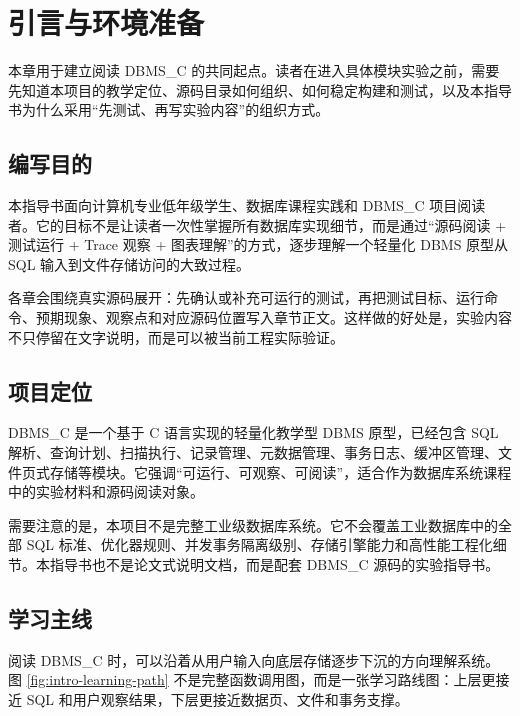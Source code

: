 \chapter{引言与环境准备}
\label{chap:intro}

本章用于建立阅读 DBMS\_C 的共同起点。读者在进入具体模块实验之前，需要先知道本项目的教学定位、源码目录如何组织、如何稳定构建和测试，以及本指导书为什么采用“先测试、再写实验内容”的组织方式。

\section{编写目的}
\label{sec:intro-purpose}

本指导书面向计算机专业低年级学生、数据库课程实践和 DBMS\_C 项目阅读者。它的目标不是让读者一次性掌握所有数据库实现细节，而是通过“源码阅读 + 测试运行 + Trace 观察 + 图表理解”的方式，逐步理解一个轻量化 DBMS 原型从 SQL 输入到文件存储访问的大致过程。

各章会围绕真实源码展开：先确认或补充可运行的测试，再把测试目标、运行命令、预期现象、观察点和对应源码位置写入章节正文。这样做的好处是，实验内容不只停留在文字说明，而是可以被当前工程实际验证。

\section{项目定位}
\label{sec:intro-positioning}

DBMS\_C 是一个基于 C 语言实现的轻量化教学型 DBMS 原型，已经包含 SQL 解析、查询计划、扫描执行、记录管理、元数据管理、事务日志、缓冲区管理、文件页式存储等模块。它强调“可运行、可观察、可阅读”，适合作为数据库系统课程中的实验材料和源码阅读对象。

需要注意的是，本项目不是完整工业级数据库系统。它不会覆盖工业数据库中的全部 SQL 标准、优化器规则、并发事务隔离级别、存储引擎能力和高性能工程化细节。本指导书也不是论文式说明文档，而是配套 DBMS\_C 源码的实验指导书。

\section{学习主线}
\label{sec:intro-learning-path}

阅读 DBMS\_C 时，可以沿着从用户输入向底层存储逐步下沉的方向理解系统。图 \ref{fig:intro-learning-path} 不是完整函数调用图，而是一张学习路线图：上层更接近 SQL 和用户观察结果，下层更接近数据页、文件和事务支撑。


